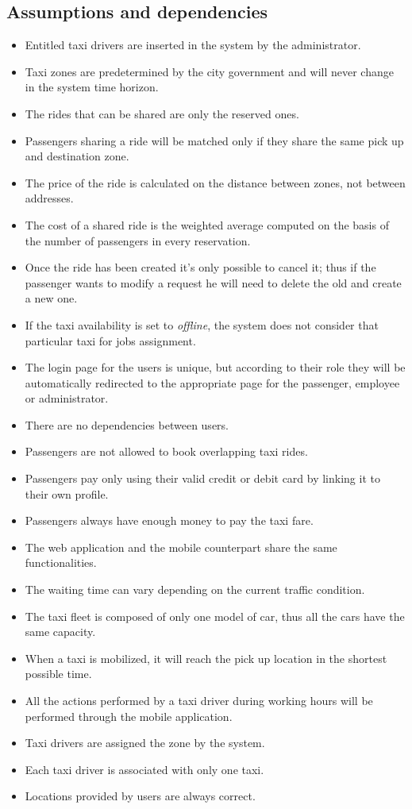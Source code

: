 \documentclass[a4paper,11pt]{report} %
\begin{document}
	\subsection{Assumptions and dependencies}
		\begin{itemize}
			\item Entitled taxi drivers are inserted in the system by the administrator.
			\item Taxi zones are predetermined by the city government and will never change in the system time horizon.
			\item The rides that can be shared are only the reserved ones.
			\item Passengers sharing a ride will be matched only if they share the same pick up and destination zone.
			\item The price of the ride is calculated on the distance between zones, not between addresses.
			\item The cost of a shared ride is the weighted average computed on the basis of the number of passengers in every reservation.
			\item Once the ride has been created it's only possible to cancel it; thus if the passenger wants to modify a request he will need to delete the old and create a new one.			
			\item If the taxi availability is set to \textit{offline}, the system does not consider that particular taxi for jobs assignment.
			\item The login page for the users is unique, but according to their role they will be automatically redirected to the appropriate page for the passenger, employee or administrator.
			\item There are no dependencies between users.
			\item Passengers are not allowed to book overlapping taxi rides.
			\item Passengers pay only using their valid credit or debit card by linking it to their own profile.
			\item Passengers always have enough money to pay the taxi fare.
			\item The web application and the mobile counterpart share the same functionalities.
			\item The waiting time can vary depending on the current traffic condition.
			\item The taxi fleet is composed of only one model of car, thus all the cars have the same capacity.
			\item When a taxi is mobilized, it will reach the pick up location in the shortest possible time.
			\item All the actions performed by a taxi driver during working hours will be performed through the mobile application.
			\item Taxi drivers are assigned the zone by the system.
			\item Each taxi driver is associated with only one taxi.
			\item Locations provided by users are always correct.
		\end{itemize}
	
\end{document}
